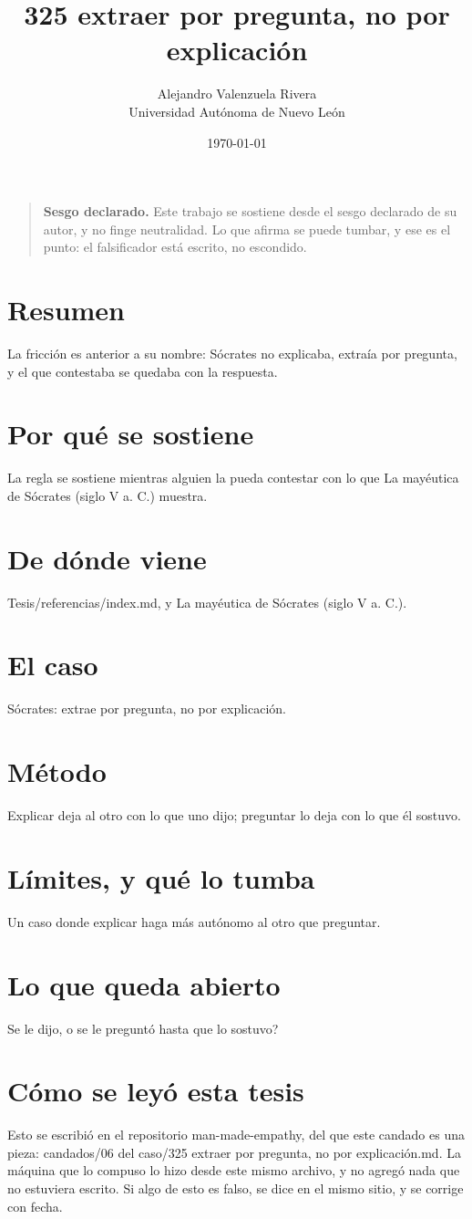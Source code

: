 \documentclass[11pt,a4paper]{article}
\title{325 extraer por pregunta, no por explicación}
\author{Alejandro Valenzuela Rivera\\\small Universidad Autónoma de Nuevo León}
\date{\today}
\begin{document}
\maketitle

\begin{quote}
\textbf{Sesgo declarado.} Este trabajo se sostiene desde el sesgo declarado de su autor, y no finge neutralidad. Lo que afirma se puede tumbar, y ese es el punto: el falsificador está escrito, no escondido.
\end{quote}

\section*{Resumen}
La fricción es anterior a su nombre: Sócrates no explicaba, extraía por pregunta, y el que contestaba se quedaba con la respuesta.

\section{Por qué se sostiene}
La regla se sostiene mientras alguien la pueda contestar con lo que La mayéutica de Sócrates (siglo V a. C.) muestra.

\section{De dónde viene}
Tesis/referencias/index.md, y La mayéutica de Sócrates (siglo V a. C.).

\section{El caso}
Sócrates: extrae por pregunta, no por explicación.

\section{Método}
Explicar deja al otro con lo que uno dijo; preguntar lo deja con lo que él sostuvo.

\section{Límites, y qué lo tumba}
Un caso donde explicar haga más autónomo al otro que preguntar.

\section{Lo que queda abierto}
\textquestiondown{}Se le dijo, o se le preguntó hasta que lo sostuvo?

\section*{Cómo se leyó esta tesis}
Esto se escribió en el repositorio man-made-empathy, del que este candado es una pieza: candados/06 del caso/325 extraer por pregunta, no por explicación.md. La máquina que lo compuso lo hizo desde este mismo archivo, y no agregó nada que no estuviera escrito. Si algo de esto es falso, se dice en el mismo sitio, y se corrige con fecha.
\end{document}
